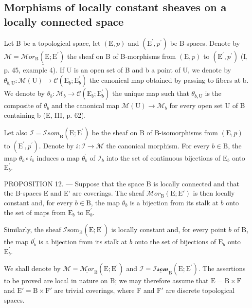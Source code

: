 \subsection{Morphisms of locally constant sheaves on a locally connected space}

Let B be a topological space, let \((\mathrm{E},p)\) and \((\mathrm{E}^{\prime},p^{\prime})\) be B-spaces. Denote by \(\mathcal{M} = \underline{\mathcal{M}or_{\mathrm{B}}(\mathrm{E};\mathrm{E}^{\prime})}\) the sheaf on B of B-morphisms from \((\mathrm{E},p)\) to \((\mathrm{E}^{\prime},p^{\prime})\) (I, p. 45, example 4). If U is an open set of B and b a point of U, we denote by \(\theta_{b,\mathrm{U}}\colon\mathcal{M}(\mathrm{U})\to\mathcal{C}(\mathrm{E}_{b};\mathrm{E}_{b}^{\prime})\) the canonical map obtained by passing to fibers at b. We denote by \(\theta_{b}\colon\mathcal{M}_{b}\to\mathcal{C}(\mathrm{E}_{b};\mathrm{E}_{b}^{\prime})\) the unique map such that \(\theta_{b,\mathrm{U}}\) is the composite of \(\theta_{b}\) and the canonical map \(\mathcal{M}(\mathrm{U})\to\mathcal{M}_{b}\) for every open set U of B containing b (E, III, p. 62).

Let also \(\mathcal{I} = \underline{\mathcal{I}som}_{\mathrm{B}}(\mathrm{E};\mathrm{E}^{\prime})\) be the sheaf on B of B-isomorphisms from \((\mathrm{E},p)\) to \((\mathrm{E}^{\prime},p^{\prime})\). Denote by \(i\colon \mathcal{I}\to \mathcal{M}\) the canonical morphism. For every \(b\in \mathrm{B}\), the map \(\theta_{b}\circ i_{b}\) induces a map \(\theta_b^\prime\) of \(\mathcal{I}_b\) into the set of continuous bijections of \(\mathrm{E}_b\) onto \(\mathrm{E}_b^\prime\).

PROPOSITION 12. --- Suppose that the space B is locally connected and that the B-spaces E and E' are coverings. The sheaf \(\mathcal{M}or_{\mathrm{B}}(\mathrm{E};\mathrm{E}')\) is then locally constant and, for every \(b\in\mathrm{B}\), the map \(\theta_{b}\) is a bijection from its stalk at \(b\) onto the set of maps from \(\mathrm{E}_{b}\) to \(\mathrm{E}_{b}^{\prime}\).

Similarly, the sheaf \(\mathcal{I}\text{som}_{\mathrm{B}}(\mathrm{E};\mathrm{E}^{\prime})\) is locally constant and, for every point \(b\) of B, the map \(\theta_{b}^{\prime}\) is a bijection from its stalk at \(b\) onto the set of bijections of \(\mathrm{E}_{b}\) onto \(\mathrm{E}_{b}^{\prime}\).

We shall denote by \(\mathcal{M} = \underline{\mathcal{M}or}_{\mathrm{B}}(\mathrm{E};\mathrm{E}^{\prime})\) and \(\mathcal{I} = \underline{\mathcal{Isom}}_{\mathrm{B}}(\mathrm{E};\mathrm{E}^{\prime})\). The assertions to be proved are local in nature on B; we may therefore assume that \(\mathrm{E} = \mathrm{B}\times \mathrm{F}\) and \(\mathrm{E}' = \mathrm{B}\times \mathrm{F}'\) are trivial coverings, where F and \(\mathrm{F}'\) are discrete topological spaces.

